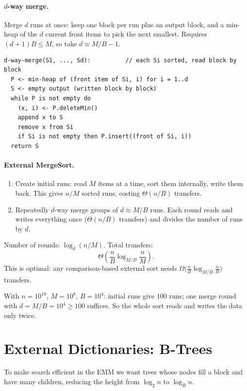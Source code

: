 \paragraph{$d$-way merge.} Merge $d$ runs at once: keep one block per run plus an
output block, and a min-heap of the $d$ current front items to pick the next
smallest. Requires $(d + 1)B \le M$, so take $d \approx M/B - 1$.

\begin{lstlisting}
d-way-merge(S1, ..., Sd):          // each Si sorted, read block by block
  P <- min-heap of (front item of Si, i) for i = 1..d
  S <- empty output (written block by block)
  while P is not empty do
    (x, i) <- P.deleteMin()
    append x to S
    remove x from Si
    if Si is not empty then P.insert((front of Si, i))
  return S
\end{lstlisting}

\paragraph{External MergeSort.}
\begin{enumerate}
  \item Create initial runs: read $M$ items at a time, sort them internally, write
        them back. This gives $n/M$ sorted runs, costing $\Theta(n/B)$ transfers.
  \item Repeatedly $d$-way merge groups of $d \approx M/B$ runs. Each round reads
        and writes everything once ($\Theta(n/B)$ transfers) and divides the
        number of runs by $d$.
\end{enumerate}
Number of rounds: $\log_{d}(n/M)$. Total transfers:
\[
\Theta\!\left(\frac nB \log_{M/B} \frac nM\right).
\]
This is optimal: any comparison-based external sort needs
$\Omega\big(\frac nB \log_{M/B} \frac nB\big)$ transfers.

\begin{example}
With $n = 10^{10}$, $M = 10^8$, $B = 10^4$: initial runs give $100$ runs; one
merge round with $d = M/B = 10^4 \ge 100$ suffices. So the whole sort reads and
writes the data only twice.
\end{example}

\section{External Dictionaries: B-Trees}

To make search efficient in the EMM we want trees whose nodes fill a block and
have many children, reducing the height from $\log_2 n$ to $\log_B n$.

